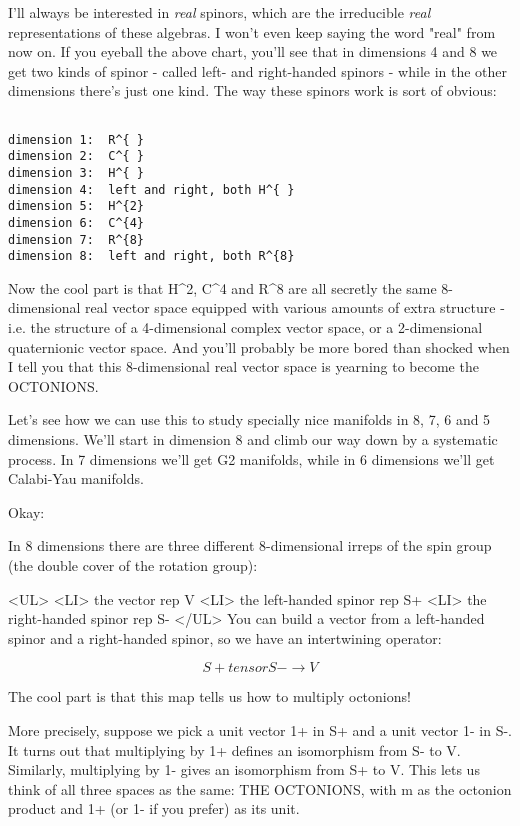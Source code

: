 I'll always be interested in \emph{real} spinors, which are the irreducible 
\emph{real} representations of these algebras.  I won't even keep saying
the word "real" from now on.  If you eyeball the above chart, you'll 
see that in dimensions 4 and 8 we get two kinds of spinor - called
left- and right-handed spinors - while in the other dimensions there's 
just one kind.  The way these spinors work is sort of obvious:


\begin{verbatim}

dimension 1:  R^{ }
dimension 2:  C^{ }
dimension 3:  H^{ }
dimension 4:  left and right, both H^{ }
dimension 5:  H^{2}
dimension 6:  C^{4}
dimension 7:  R^{8}
dimension 8:  left and right, both R^{8}
\end{verbatim}
    

Now the cool part is that H^{2}, C^{4} and
R^{8} are all secretly the same 8-dimensional real vector
space equipped with various amounts of extra structure - i.e. the
structure of a 4-dimensional complex vector space, or a 2-dimensional
quaternionic vector space.  And you'll probably be more bored than
shocked when I tell you that this 8-dimensional real vector space is
yearning to become the OCTONIONS.

Let's see how we can use this to study specially nice manifolds
in 8, 7, 6 and 5 dimensions.   We'll start in dimension 8 and climb
our way down by a systematic process.  In 7 dimensions we'll get G2 
manifolds, while in 6 dimensions we'll get Calabi-Yau manifolds.

Okay:

In 8 dimensions there are three different 8-dimensional irreps of the 
spin group (the double cover of the rotation group):

<UL>
<LI>
the vector rep V 
<LI>
the left-handed spinor rep S+    
<LI>
the right-handed spinor rep S-  
</UL>
You can build a vector from a left-handed spinor and a
right-handed spinor, so we have an intertwining operator: 


$$

S+ tensor S- \to  V
$$
    
The cool part is that this map tells us how to multiply octonions!

More precisely, suppose we pick a unit vector 1+ in S+ and a unit vector 
1- in S-.   It turns out that multiplying by 1+ defines an isomorphism 
from S- to V.  Similarly, multiplying by 1- gives an isomorphism from 
S+ to V.  This lets us think of all three spaces as the same: THE OCTONIONS, 
with m as the octonion product and 1+ (or 1- if you prefer) as its unit.

